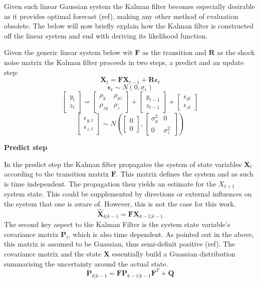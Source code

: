 \documentclass[12pt,a4paper,english]{article} %
\newcommand{\matr}[1]{\mathbf{#1}} %
\begin{document}
	Given such linear Gaussian system the Kalman filter becomes especially desirable as it provides optimal forecast (ref), making any other method of evaluation obsolete. The below will now briefly explain how the Kalman filter is constructed off the linear system and end with deriving its likelihood function.
	
	Given the generic linear system below wit $\matr{F}$ as the transition and $\matr R$ as the shock noise matrix the Kalman filter proceeds in two steps, a predict and an update step:\\
	\[
		\matr{X}_t = \matr F \matr{X}_{t-1} + \matr R \matr{\epsilon}_t
	\]
	\[
	\matr{\epsilon}_t \sim N(0, \sigma_{\epsilon})
	\]	
	\[
			\begin{bmatrix}
				y_t \\
				z_t
			\end{bmatrix}
		=
			\begin{bmatrix}
				\rho_y & \rho_{yz} \\
				\rho_{zy} & \rho_z
			\end{bmatrix}
		+
			\begin{bmatrix}
				y_{t-1} \\
				z_{t-1}
			\end{bmatrix}
		+
			\begin{bmatrix}
				\epsilon_{yt} \\
				\epsilon_{zt}
			\end{bmatrix}				
	\]
	\[
		\begin{bmatrix}
			\epsilon_{y,t} \\
			\epsilon_{z, t}
		\end{bmatrix}
		\sim
		N
		\left(
			\begin{bmatrix}
				0 \\
				0
			\end{bmatrix}
		,
			\begin{bmatrix}
				\sigma_y^2 & 0 \\
				0 & \sigma_z^2
			\end{bmatrix}
		\right)
	\]
		
	\textbf{Predict step}
	
	In the predict step the Kalman filter propagates the system of state variables $\matr X_{t}$ according to the transition matrix $\matr F$. This matrix defines the system and as such is time independent. The propagation then yields an estimate for the $X_{t+1}$ system state. This could be supplemented by directions or external influences on the system that one is aware of. However, this is not the case for this work.
	\[
		\matr{\hat{X}}_{k|k-1} = \matr F \matr X_{k-1|k-1}
	\]
	The second key aspect to the Kalman Filter is the system state variable's covariance matrix $\matr P_{t}$, which is also time dependent. As pointed out in the above, this matrix is assumed to be Guassian, thus semi-definit positive (ref). The covariance matrix and the state $\matr X$ essentially build a Guassian distribution summarising the uncertainty around the actual state.
	\[
		\matr{P}_{k| k-1} = \matr F \matr{P}_{k-1| k-1} \matr{F}^T + \matr Q
	\]
	
\end{document}
